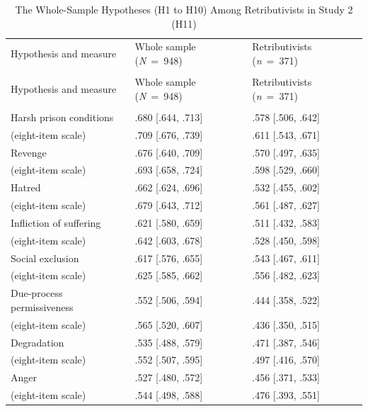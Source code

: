 \begin{longtable}{@{}>{\raggedright\arraybackslash}p{2.542in}>{\centering\arraybackslash}p{1.812in}>{\centering\arraybackslash}p{1.812in}@{}}
\noalign{\gdef\thetable{S17}}
\caption{The Whole-Sample Hypotheses (H1 to H10) Among Retributivists in Study 2 (H11)}\label{tab:s17}\\
\toprule
Hypothesis and measure & Whole sample (\emph{N}~=~948) & Retributivists (\emph{n}~=~371) \\
\midrule
\endfirsthead
\multicolumn{3}{@{}l}{\textit{Table S17 (continued)}}\\[4pt]
\toprule
Hypothesis and measure & Whole sample (\emph{N}~=~948) & Retributivists (\emph{n}~=~371) \\
\midrule
\endhead
\multicolumn{3}{@{}l@{}}{\emph{H1: correlation with punitiveness}} \\*
Harsh prison conditions & .680 {[}.644, .713{]} & .578 {[}.506, .642{]} \\
(eight-item scale) & .709 {[}.676, .739{]} & .611 {[}.543, .671{]} \\
Revenge & .676 {[}.640, .709{]} & .570 {[}.497, .635{]} \\
(eight-item scale) & .693 {[}.658, .724{]} & .598 {[}.529, .660{]} \\
Hatred & .662 {[}.624, .696{]} & .532 {[}.455, .602{]} \\
(eight-item scale) & .679 {[}.643, .712{]} & .561 {[}.487, .627{]} \\
Infliction of suffering & .621 {[}.580, .659{]} & .511 {[}.432, .583{]} \\
(eight-item scale) & .642 {[}.603, .678{]} & .528 {[}.450, .598{]} \\
Social exclusion & .617 {[}.576, .655{]} & .543 {[}.467, .611{]} \\
(eight-item scale) & .625 {[}.585, .662{]} & .556 {[}.482, .623{]} \\
Due-process permissiveness & .552 {[}.506, .594{]} & .444 {[}.358, .522{]} \\
(eight-item scale) & .565 {[}.520, .607{]} & .436 {[}.350, .515{]} \\
Degradation & .535 {[}.488, .579{]} & .471 {[}.387, .546{]} \\
(eight-item scale) & .552 {[}.507, .595{]} & .497 {[}.416, .570{]} \\
Anger & .527 {[}.480, .572{]} & .456 {[}.371, .533{]} \\
(eight-item scale) & .544 {[}.498, .588{]} & .476 {[}.393, .551{]} \\

\end{longtable}
